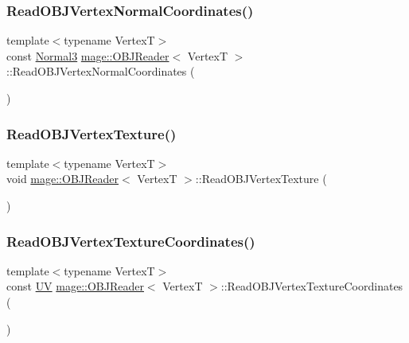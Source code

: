 \subsubsection{\texorpdfstring{Read\+O\+B\+J\+Vertex\+Normal\+Coordinates()}{ReadOBJVertexNormalCoordinates()}}
{\footnotesize\ttfamily template$<$typename VertexT$>$ \\
const \hyperlink{structmage_1_1_normal3}{Normal3} \hyperlink{classmage_1_1_o_b_j_reader}{mage\+::\+O\+B\+J\+Reader}$<$ VertexT $>$\+::Read\+O\+B\+J\+Vertex\+Normal\+Coordinates (\begin{DoxyParamCaption}{ }\end{DoxyParamCaption})\hspace{0.3cm}{\ttfamily [private]}}

\hypertarget{classmage_1_1_o_b_j_reader_ae0dfedd81f23e6e15725e9ef02dd3034}{}\label{classmage_1_1_o_b_j_reader_ae0dfedd81f23e6e15725e9ef02dd3034} 
\subsubsection{\texorpdfstring{Read\+O\+B\+J\+Vertex\+Texture()}{ReadOBJVertexTexture()}}
{\footnotesize\ttfamily template$<$typename VertexT$>$ \\
void \hyperlink{classmage_1_1_o_b_j_reader}{mage\+::\+O\+B\+J\+Reader}$<$ VertexT $>$\+::Read\+O\+B\+J\+Vertex\+Texture (\begin{DoxyParamCaption}{ }\end{DoxyParamCaption})\hspace{0.3cm}{\ttfamily [private]}}

\hypertarget{classmage_1_1_o_b_j_reader_a9b1a38d60a9d1c5c9095394fa37375e6}{}\label{classmage_1_1_o_b_j_reader_a9b1a38d60a9d1c5c9095394fa37375e6} 
\subsubsection{\texorpdfstring{Read\+O\+B\+J\+Vertex\+Texture\+Coordinates()}{ReadOBJVertexTextureCoordinates()}}
{\footnotesize\ttfamily template$<$typename VertexT$>$ \\
const \hyperlink{structmage_1_1_u_v}{UV} \hyperlink{classmage_1_1_o_b_j_reader}{mage\+::\+O\+B\+J\+Reader}$<$ VertexT $>$\+::Read\+O\+B\+J\+Vertex\+Texture\+Coordinates (\begin{DoxyParamCaption}{ }\end{DoxyParamCaption})\hspace{0.3cm}{\ttfamily [private]}}




